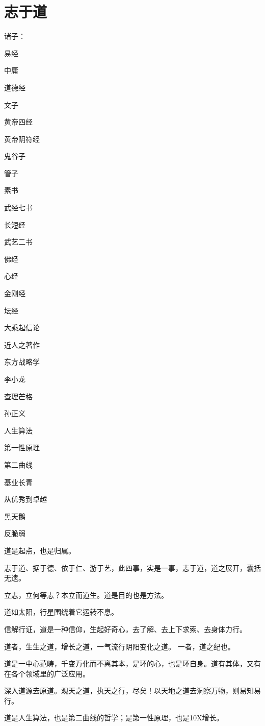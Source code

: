 \chapter{志于道}

诸子：
\begin{enumbox}
\item 易经
\item 中庸
\item 道德经
\item 文子
\item 黄帝四经
\item 黄帝阴符经
\item 鬼谷子
\item 管子
\item 素书
\item 武经七书
\item 长短经
\item 武艺二书
\end{enumbox}

佛经
\begin{enumbox}
\item 心经
\item 金刚经
\item 坛经
\item 大乘起信论
\end{enumbox}

近人之著作
\begin{enumbox}
\item 东方战略学
\item 李小龙
\item 查理芒格
\item 孙正义
\item 人生算法
\item 第一性原理
\item 第二曲线
\item 基业长青
\item 从优秀到卓越
\item 黑天鹅
\item 反脆弱
\end{enumbox}

道是起点，也是归属。

志于道、据于德、依于仁、游于艺，此四事，实是一事，志于道，道之展开，囊括无遗。

立志，立何等志？本立而道生。道是目的也是方法。

道如太阳，行星围绕着它运转不息。

信解行证，道是一种信仰，生起好奇心，去了解、去上下求索、去身体力行。

道者，生生之道，增长之道，一气流行阴阳变化之道。
一者，道之纪也。

道是一中心范畴，千变万化而不离其本，是环的心，也是环自身。道有其体，又有在各个领域里的广泛应用。

深入道源去原道。观天之道，执天之行，尽矣！以天地之道去洞察万物，则易知易行。

道是人生算法，也是第二曲线的哲学；是第一性原理，也是10X增长。
